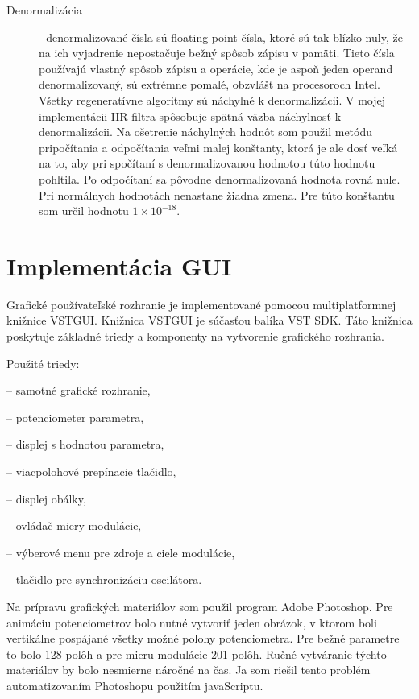 \begin{description}
\item[Denormalizácia] - denormalizované čísla sú floating-point čísla, ktoré sú tak blízko nuly, že na ich vyjadrenie nepostačuje bežný spôsob zápisu v pamäti. Tieto čísla používajú vlastný spôsob zápisu a operácie, kde je aspoň jeden operand denormalizovaný, sú extrémne pomalé, obzvlášť na procesoroch Intel. Všetky regeneratívne algoritmy sú náchylné k denormalizácii. V mojej implementácii IIR filtra spôsobuje spätná väzba náchylnosť k denormalizácii. 
Na ošetrenie náchylných hodnôt som použil metódu pripočítania a odpočítania veľmi malej konštanty, ktorá je ale dosť veľká na to, aby pri spočítaní s denormalizovanou hodnotou túto hodnotu pohltila. Po odpočítaní sa pôvodne denormalizovaná hodnota rovná nule. Pri normálnych hodnotách nenastane žiadna zmena. Pre túto konštantu som určil hodnotu $1 \times 10^{-18}$.
\end{description}

\section{Implementácia GUI}
Grafické používateľské rozhranie je implementované pomocou multiplatformnej knižnice VSTGUI. Knižnica VSTGUI je súčasťou balíka VST SDK. Táto knižnica poskytuje základné triedy a komponenty na vytvorenie grafického rozhrania.

Použité triedy:

\begin{description}
\setlength{\itemsep}{-0.5ex}
\item[cMirEditor] -- samotné grafické rozhranie, 
\item[CAnimKnob] -- potenciometer parametra,
\item[CParamDisplay] -- displej s hodnotou parametra, 
\item[cMultiStateButton] -- viacpolohové prepínacie tlačidlo, 
\item[cEnvDisplay] -- displej obálky, 
\item[cModAmtKnob] -- ovládač miery modulácie, 
\item[cModSelect] -- výberové menu pre zdroje a ciele modulácie, 
\item[cSyncButton] -- tlačidlo pre synchronizáciu oscilátora. 
\end{description}

Na prípravu grafických materiálov som použil program Adobe Photoshop. Pre animáciu potenciometrov bolo nutné vytvoriť jeden obrázok, v ktorom boli vertikálne pospájané všetky možné polohy potenciometra. Pre bežné parametre to bolo 128 polôh a pre mieru modulácie 201 polôh. Ručné vytváranie týchto materiálov by bolo nesmierne náročné na čas. Ja som riešil tento problém automatizovaním Photoshopu použitím javaScriptu.

